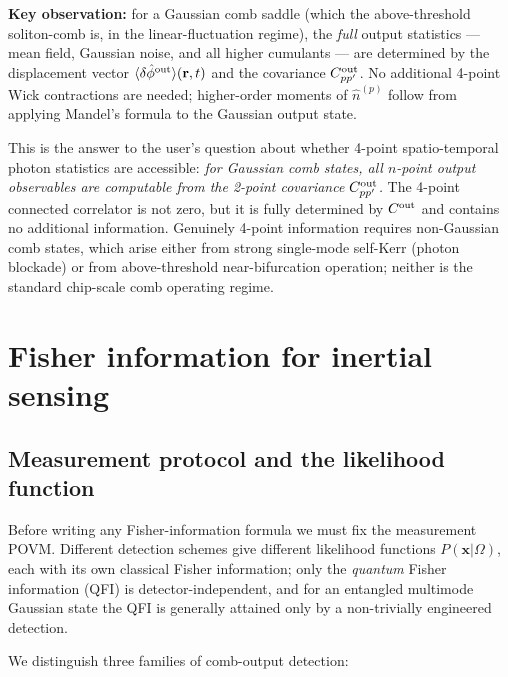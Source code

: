 \documentclass[11pt]{article}
\begin{document}
\textbf{Key observation:}  for a Gaussian comb saddle (which the
above-threshold soliton-comb is, in the linear-fluctuation regime), the
\emph{full} output statistics --- mean field, Gaussian noise, and all
higher cumulants --- are determined by the displacement vector
$\langle\delta\hat\phi^{\rm out}\rangle(\mathbf{r}, t)$ and the
covariance $C^{\rm out}_{pp'}$.  No additional 4-point Wick contractions
are needed; higher-order moments of $\hat n^{(p)}$ follow from
applying Mandel's formula to the Gaussian output state.

\begin{remark}
This is the answer to the user's question about whether 4-point
spatio-temporal photon statistics are accessible: \emph{for Gaussian
comb states, all $n$-point output observables are computable from the
2-point covariance $C^{\rm out}_{pp'}$.}  The 4-point connected
correlator is not zero, but it is fully determined by $C^{\rm out}$ and
contains no additional information.  Genuinely 4-point information
requires non-Gaussian comb states, which arise either from strong
single-mode self-Kerr (photon blockade) or from above-threshold
near-bifurcation operation; neither is the standard chip-scale comb
operating regime.
\end{remark}

\section{Fisher information for inertial sensing}
\label{sec:FI}

\subsection{Measurement protocol and the likelihood function}
\label{sec:measurement_protocol}

Before writing any Fisher-information formula we must fix the
measurement POVM.  Different detection schemes give different
likelihood functions $P(\mathbf{x}|\Omega)$, each with its own classical
Fisher information; only the \emph{quantum} Fisher information (QFI)
is detector-independent, and for an entangled multimode Gaussian state
the QFI is generally attained only by a non-trivially engineered
detection.

We distinguish three families of comb-output detection:
\end{document}
